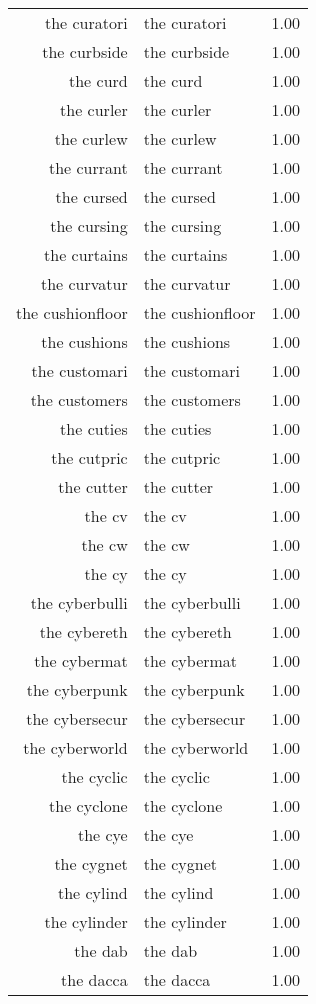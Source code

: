 \begin{table}[ht]
\begin{tabular}{rlr}
  the curatori & the curatori & 1.00 \\ 
  the curbside & the curbside & 1.00 \\ 
  the curd & the curd & 1.00 \\ 
  the curler & the curler & 1.00 \\ 
  the curlew & the curlew & 1.00 \\ 
  the currant & the currant & 1.00 \\ 
  the cursed & the cursed & 1.00 \\ 
  the cursing & the cursing & 1.00 \\ 
  the curtains & the curtains & 1.00 \\ 
  the curvatur & the curvatur & 1.00 \\ 
  the cushionfloor & the cushionfloor & 1.00 \\ 
  the cushions & the cushions & 1.00 \\ 
  the customari & the customari & 1.00 \\ 
  the customers & the customers & 1.00 \\ 
  the cuties & the cuties & 1.00 \\ 
  the cutpric & the cutpric & 1.00 \\ 
  the cutter & the cutter & 1.00 \\ 
  the cv & the cv & 1.00 \\ 
  the cw & the cw & 1.00 \\ 
  the cy & the cy & 1.00 \\ 
  the cyberbulli & the cyberbulli & 1.00 \\ 
  the cybereth & the cybereth & 1.00 \\ 
  the cybermat & the cybermat & 1.00 \\ 
  the cyberpunk & the cyberpunk & 1.00 \\ 
  the cybersecur & the cybersecur & 1.00 \\ 
  the cyberworld & the cyberworld & 1.00 \\ 
  the cyclic & the cyclic & 1.00 \\ 
  the cyclone & the cyclone & 1.00 \\ 
  the cye & the cye & 1.00 \\ 
  the cygnet & the cygnet & 1.00 \\ 
  the cylind & the cylind & 1.00 \\ 
  the cylinder & the cylinder & 1.00 \\ 
  the dab & the dab & 1.00 \\ 
  the dacca & the dacca & 1.00 \\ 

\end{tabular}
\end{table}

